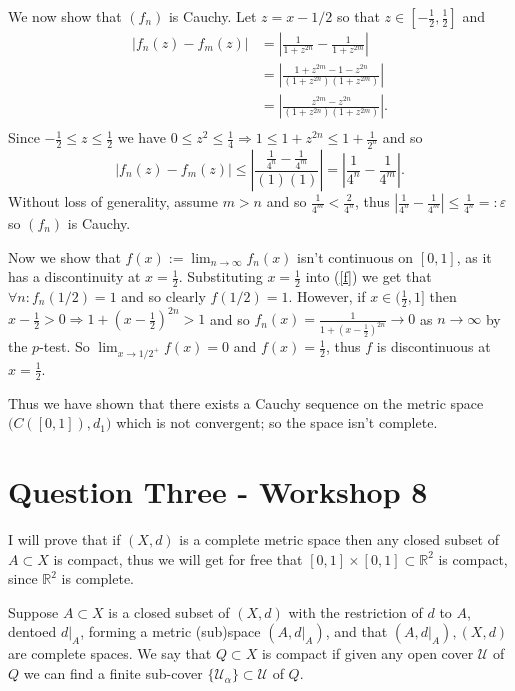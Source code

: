 \documentclass{article}
\def \R {\mathbb{R}}
\begin{document}
We now show that $(f_n)$ is Cauchy. Let $z=x-1/2$ so that $z\in\left[-\frac12,\frac12\right]$ and
	\begin{align*}
		|f_n(z)-f_m(z)| 
		&= \left|\frac{1}{1+z^{2n}} - \frac{1}{1+z^{2m}}\right| \\
		&= \left|\frac{1+z^{2m} - 1 - z^{2n}}{(1+z^{2n})(1+z^{2m})}\right| \\
		&= \left|\frac{z^{2m} - z^{2n}}{ (1+z^{2n})(1+z^{2m})}\right|. \\
	\end{align*} 
Since $-\frac12 \leq z \leq \frac12$ we have $0\leq z^2\leq \frac14 \Rightarrow 1 \leq 1+z^{2n}\leq 1+\frac{1}{2^n}$ and so 
	\[
		|f_n(z)-f_m(z)|\leq
		\left| \frac{\frac{1}{4^n}-\frac{1}{4^m}}{(1)(1)}\right|=
		\left| \frac{1}{4^n} - \frac{1}{4^m} \right|.
	\]
Without loss of generality, assume $m>n$ and so $\frac{1}{4^m}<\frac{2}{4^n}$, thus $\left|\frac{1}{4^n} - \frac{1}{4^m}\right| \leq \frac{1}{4^n} =: \varepsilon$ so $(f_n)$ is Cauchy.

Now we show that $f(x) := \lim_{n\to\infty}f_n(x)$ isn't continuous on $[0,1]$, as it has a discontinuity at $x=\frac12$. Substituting $x=\frac12$ into (\ref{f}) we get that $\forall n:f_n(1/2) = 1$ and so clearly $f(1/2)=1$. However, if $x\in(\frac12,1]$ then $x-\frac12 >0 \Rightarrow 1+(x-\frac12)^{2n}>1$ and so $f_n(x) = \frac{1}{1+(x-\frac12)^{2n}} \to 0$ as $n\to\infty$ by the $p$-test. So $\lim_{x\to 1/2^+} f(x) =0$ and $f(x)=\frac12$, thus $f$ is discontinuous at $x=\frac12$.

Thus we have shown that there exists a Cauchy sequence on the metric space $\Big(C([0,1]),d_1\Big)$ which is not convergent; so the space isn't complete.

\section*{Question Three - Workshop 8}
I will prove that if $(X,d)$ is a complete metric space then any closed subset of $A\subset X$ is compact, thus we will get for free that $[0,1]\times[0,1]\subset\R^2$ is compact, since $\R^2$ is complete.

Suppose $A\subset X$ is a closed subset of $(X,d)$ with the restriction of $d$ to $A$, dentoed $d|_A$, forming a metric (sub)space $(A,d|_A)$, and that $(A,d|_A),(X,d)$ are complete spaces. We say that $Q\subset X$ is compact if given any open cover $\mathcal{U}$ of $Q$ we can find a finite sub-cover $\{\mathcal{U}_\alpha\}\subset\mathcal{U}$ of $Q$.
\end{document}
